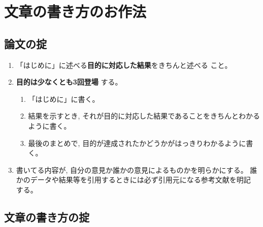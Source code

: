 \documentclass[12pt, ]{jsarticle}
\providecommand{\tightlist}{%
   \setlength{\itemsep}{0pt}\setlength{\parskip}{0pt}}
\begin{document}
\section{文章の書き方のお作法}\label{ux6587ux7ae0ux306eux66f8ux304dux65b9ux306eux304aux4f5cux6cd5}

\subsection{論文の掟}\label{ux8ad6ux6587ux306eux639f}

\begin{enumerate}
\tightlist
\item
  「はじめに」に述べる\textbf{目的に対応した結果}をきちんと述べる こと。
\item
  \textbf{目的は少なくとも3回登場} する。

  \begin{enumerate}
  \tightlist
  \item
    「はじめに」に書く。
  \item
    結果を示すとき,
    それが目的に対応した結果であることをきちんとわかるように書く。
  \item
    最後のまとめで, 目的が達成されたかどうかがはっきりわかるように書く。
  \end{enumerate}
\item
  書いてる内容が, 自分の意見か誰かの意見によるものかを明らかにする。
  誰かのデータや結果等を引用するときには必ず引用元になる参考文献を明記
  する。
\end{enumerate}

\subsection{文章の書き方の掟}\label{ux6587ux7ae0ux306eux66f8ux304dux65b9ux306eux639f}
\end{document}
